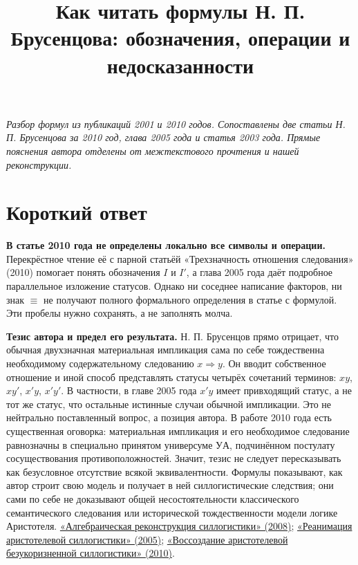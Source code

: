 \documentclass[12pt,a4paper]{article}
\title{Как читать формулы Н. П. Брусенцова: обозначения, операции и недосказанности}
\author{}
\date{}
\begin{document}
\maketitle

\emph{Разбор формул из публикаций 2001 и 2010 годов. Сопоставлены две статьи Н. П. Брусенцова за 2010 год, глава 2005 года и статья 2003 года. Прямые пояснения автора отделены от межтекстового прочтения и нашей реконструкции.}

\section{Короткий ответ}

\textbf{В статье 2010 года не определены локально все символы и операции.} Перекрёстное чтение её с парной статьёй «Трехзначность отношения следования» (2010) помогает понять обозначения $I$ и $I'$, а глава 2005 года даёт подробное параллельное изложение статусов. Однако ни соседнее написание факторов, ни знак $\equiv$ не получают полного формального определения в статье с формулой. Эти пробелы нужно сохранять, а не заполнять молча.

\textbf{Тезис автора и предел его результата.} Н. П. Брусенцов прямо отрицает, что обычная двухзначная материальная импликация сама по себе тождественна необходимому содержательному следованию $x\Rightarrow y$. Он вводит собственное отношение и иной способ представлять статусы четырёх сочетаний терминов: $xy$, $xy'$, $x'y$, $x'y'$. В частности, в главе 2005 года $x'y$ имеет привходящий статус, а не тот же статус, что остальные истинные случаи обычной импликации. Это не нейтрально поставленный вопрос, а позиция автора. В работе 2010 года есть существенная оговорка: материальная импликация и его необходимое следование равнозначны в специально принятом универсуме $УА$, подчинённом постулату сосуществования противоположностей. Значит, тезис не следует пересказывать как безусловное отсутствие всякой эквивалентности. Формулы показывают, как автор строит свою модель и получает в ней силлогистические следствия; они сами по себе не доказывают общей несостоятельности классического семантического следования или исторической тождественности модели логике Аристотеля. \href{https://ternarycomp.cs.msu.ru/Papers/Alrek.pdf}{«Алгебраическая реконструкция силлогистики» (2008)}; \href{https://ternarycomp.cs.msu.ru/Papers/Rea.pdf}{«Реанимация аристотелевой силлогистики» (2005)}; \href{https://ternarycomp.cs.msu.ru/Papers/brusentsov_sborn2010_2.pdf}{«Воссоздание аристотелевой безукоризненной силлогистики» (2010)}.
\end{document}
